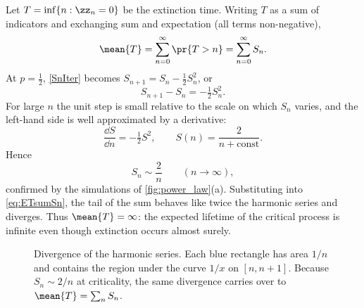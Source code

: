 Let \(T=\inf\{n:\zz_n=0\}\) be the extinction time. Writing \(T\) as a sum of indicators and exchanging sum and expectation (all terms non-negative),
\begin{equation}
\label{eq:ETsumSn}
\mean{T} = \sum_{n=0}^{\infty}\pr{T>n} = \sum_{n=0}^{\infty}S_n .
\end{equation}
At \(p=\tfrac12\), \cref{SnIter} becomes \(S_{n+1}=S_n-\tfrac12 S_n^2\), or
\begin{equation*}
S_{n+1}-S_n = -\tfrac12 S_n^2 .
\end{equation*}
For large \(n\) the unit step is small relative to the scale on which \(S_n\) varies, and the left-hand side is well approximated by a derivative:
\begin{equation*}
\frac{\dd S}{\dd n} = -\tfrac12 S^2,
\qquad
S(n) = \frac{2}{n + \text{const}}.
\end{equation*}
Hence
\begin{equation}
\label{twoovrn_sn}
S_n \sim \frac{2}{n}\qquad (n\to\infty),
\end{equation}
confirmed by the simulations of \cref{fig:power_law}(a). Substituting into \cref{eq:ETsumSn}, the tail of the sum behaves like twice the harmonic series and diverges. Thus \(\mean{T}=\infty\): the expected lifetime of the critical process is infinite even though extinction occurs almost surely.

\begin{figure}[H]
    \centering
{}
\caption{Divergence of the harmonic series. Each blue rectangle has area \(1/n\) and contains the region under the curve \(1/x\) on \([n,n+1]\). Because \(S_n\sim 2/n\) at criticality, the same divergence carries over to \(\mean{T}=\sum_n S_n\).}
\label{fig:harmonic}
\end{figure}

